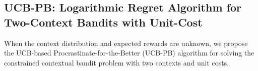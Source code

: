 %

\subsection{UCB-PB: Logarithmic Regret Algorithm for Two-Context Bandits with Unit-Cost}\label{app:ucb_pb}
When the context distribution and expected rewards are unknown, we propose the UCB-based Procrastinate-for-the-Better (UCB-PB) algorithm for solving the constrained contextual bandit problem with two contexts and unit costs.

